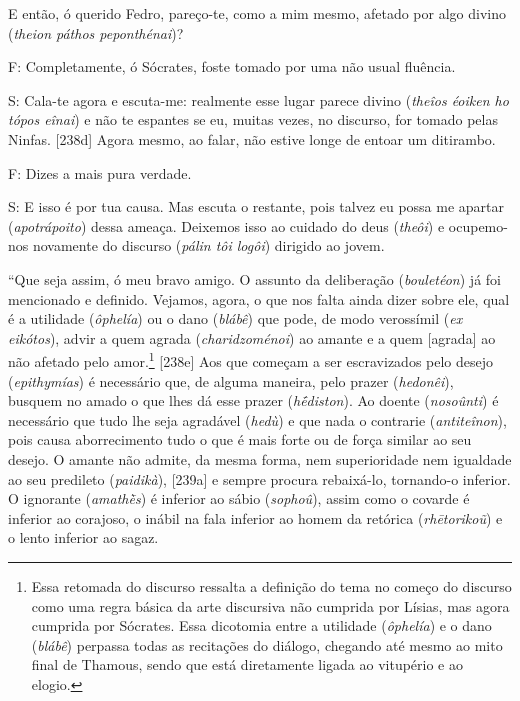 E então, ó querido Fedro, pareço-te, como a mim mesmo, afetado por algo
divino (\emph{theion páthos peponthénai})?

F: Completamente, ó Sócrates, foste tomado por uma não usual fluência.

S: Cala-te agora e escuta-me: realmente esse lugar parece divino
(\emph{theîos éoiken ho tópos eînai}) e não te espantes se eu, muitas
vezes, no discurso, for tomado pelas Ninfas. {[}238d{]} Agora mesmo, ao
falar, não estive longe de entoar um ditirambo.

F: Dizes a mais pura verdade.

S: E isso é por tua causa. Mas escuta o restante, pois talvez eu possa
me apartar (\emph{apotrápoito}) dessa ameaça. Deixemos isso ao cuidado
do deus (\emph{theôi}) e ocupemo-nos novamente do discurso (\emph{pálin
tôi logôi}) dirigido ao jovem.

``Que seja assim, ó meu bravo amigo. O assunto da deliberação
(\emph{bouletéon}) já foi mencionado e definido. Vejamos, agora, o que
nos falta ainda dizer sobre ele, qual é a utilidade (\emph{ôphelía}) ou
o dano (\emph{blábê}) que pode, de modo verossímil (\emph{ex eikótos}),
advir a quem agrada (\emph{charidzoménoi}) ao amante e a quem
{[}agrada{]} ao não afetado pelo amor.\footnote{Essa retomada do
  discurso ressalta a definição do tema no começo do discurso como uma
  regra básica da arte discursiva não cumprida por Lísias, mas agora
  cumprida por Sócrates. Essa dicotomia entre a utilidade
  (\emph{ôphelía}) e o dano (\emph{blábê}) perpassa todas as recitações
  do diálogo, chegando até mesmo ao mito final de Thamous, sendo que
  está diretamente ligada ao vitupério e ao elogio.} {[}238e{]} Aos que
começam a ser escravizados pelo desejo (\emph{epithymías}) é necessário
que, de alguma maneira, pelo prazer (\emph{hedonêi}), busquem no amado o
que lhes dá esse prazer (\emph{hḗdiston}). Ao doente (\emph{nosoûnti}) é
necessário que tudo lhe seja agradável (\emph{hedù}) e que nada o
contrarie (\emph{antiteînon}), pois causa aborrecimento tudo o que é
mais forte ou de força similar ao seu desejo. O amante não admite, da
mesma forma, nem superioridade nem igualdade ao seu predileto
(\emph{paidikà}), {[}239a{]} e sempre procura rebaixá-lo, tornando-o
inferior. O ignorante (\emph{amathḕs}) é inferior ao sábio
(\emph{sophoû}), assim como o covarde é inferior ao corajoso, o inábil
na fala inferior ao homem da retórica (\emph{rhētorikoũ}) e o lento
inferior ao sagaz.


